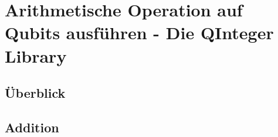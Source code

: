 \chapter{Arithmetische Operation auf Qubits ausführen - Die QInteger Library}
\section{Überblick}

\section{Addition}